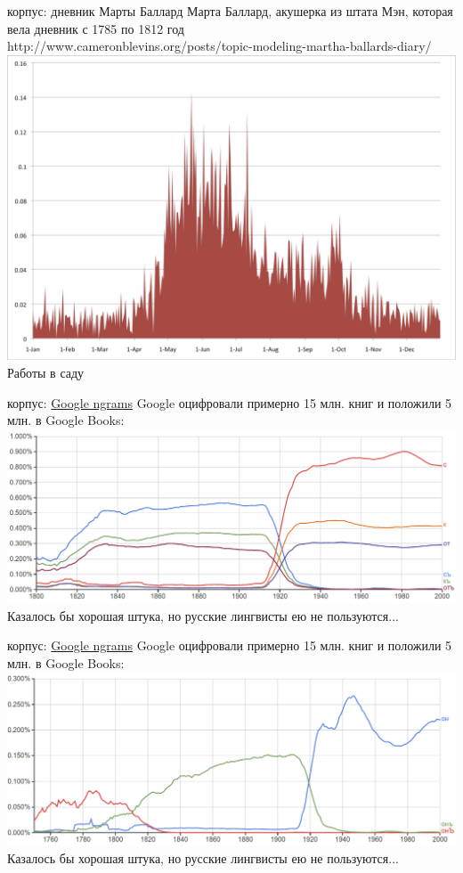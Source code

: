 \documentclass[13pt, t]{beamer}
\begin{document}
\begin{frame}{корпус: дневник Марты Баллард}
Марта Баллард, акушерка из штата Мэн, которая вела дневник с 1785 по 1812 год\\
{\tiny http://www.cameronblevins.org/posts/topic-modeling-martha-ballards-diary/}
\includegraphics[width=0.8\linewidth]{images/02-ballard}\\
\pause
Работы в саду
\end{frame}

\begin{frame}{корпус: \href{https://books.google.com/ngrams}{Google ngrams}}
Google оцифровали примерно 15 млн. книг и положили 5 млн. в Google Books:\\
\includegraphics[width=\linewidth]{images/03-google-ngrams}\\
Казалось бы хорошая штука, но русские лингвисты ею не пользуются...
\end{frame}

\begin{frame}{корпус: \href{https://books.google.com/ngrams}{Google ngrams}}
Google оцифровали примерно 15 млн. книг и положили 5 млн. в Google Books:\\
\includegraphics[width=\linewidth]{images/04-google-ngrams}\\
Казалось бы хорошая штука, но русские лингвисты ею не пользуются...
\end{frame}
\end{document}

